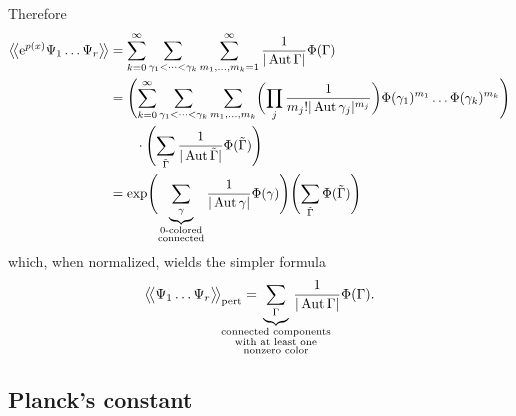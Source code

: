 Therefore
\begin{align*}
  \big \langle \! \big \langle {\mathrm{e}^{p(x)} \Psi_1 \dots \Psi_r} \big \rangle \! \big \rangle
  &= \sum_{k=0}^\infty \sum_{\gamma_1 < \dots < \gamma_k} \sum_{m_1, \dots, m_k =1}^\infty
  \frac{1}{|\operatorname{Aut} \Gamma|} \Phi(\Gamma) \\
  &= \Biggl( \sum_{k=0}^\infty \sum_{\gamma_1 < \dots < \gamma_k} \sum_{m_1, \dots, m_k}
    \biggl( \prod_j \frac{1}{m_j! |\operatorname{Aut} \gamma_j|^{m_j}} \biggr)
    \Phi(\gamma_1)^{m_1} \dots \Phi(\gamma_k)^{m_k} \Biggr) \\
  &\qquad \cdot \Biggl( \sum_{\tilde{\Gamma}} \frac{1}{|\operatorname{Aut} \tilde{\Gamma}|} \Phi(\tilde{\Gamma}) \Biggr) \\
  &= \exp \Biggl( \underbrace{\sum_{\gamma}}_{\substack{0 \text{-colored} \\ \text{connected}}}
    \frac{1}{|\operatorname{Aut} \gamma|} \Phi(\gamma) \Biggr) 
    \Biggl( \sum_{\tilde{\Gamma}} \Phi(\tilde{\Gamma}) \Biggr) \\
\end{align*}
which, when normalized, wields the simpler formula
\begin{equation*}
  \bigavg{\Psi_1 \dots \Psi_r}_\text{pert}
  = \hspace{-1cm}
  \underbrace{\sum_{\Gamma}}_{\substack{
      \text{connected components} \\
      \text{with at least one} \\
      \text{nonzero color}
  }}
  \hspace{-1cm} \frac{1}{|\Aut \Gamma|} \Phi (\Gamma).
\end{equation*}

\subsection{Planck's constant}


